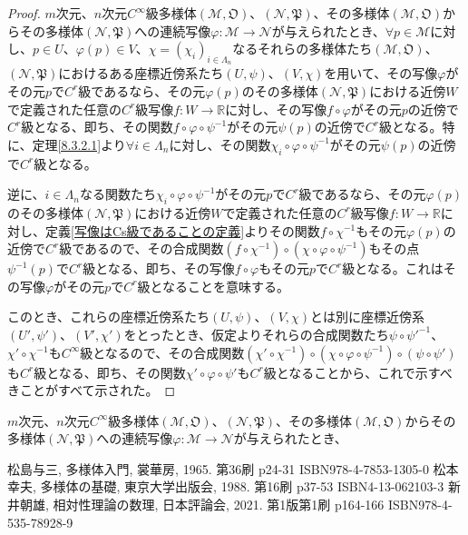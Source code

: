 \documentclass[dvipdfmx]{jsarticle}
\begin{document}
\begin{proof}
$m$次元、$n$次元$C^\infty $級多様体$\left( \mathcal{M},\mathfrak{O} \right) $、$\left( \mathcal{N},\mathfrak{P} \right) $、その多様体$\left( \mathcal{M},\mathfrak{O} \right) $からその多様体$\left( \mathcal{N},\mathfrak{P} \right) $への連続写像$\varphi :\mathcal{M} \rightarrow \mathcal{N} $が与えられたとき、$\forall p\in \mathcal{M}$に対し、$p\in U$、$\varphi \left(p\right) \in V$、$\chi=\left(\chi_i \right)_{i\in \varLambda_n }$なるそれらの多様体たち$\left(\mathcal{M},\mathfrak{O}\right)$、$\left(\mathcal{N},\mathfrak{P}\right)$におけるある座標近傍系たち$\left(U,\psi\right)$、$\left(V,\chi\right)$を用いて、その写像$\varphi $がその元$p$で$C^r $級であるなら、その元$\varphi (p)$のその多様体$\left( \mathcal{N},\mathfrak{P} \right) $における近傍$W$で定義された任意の$C^r $級写像$f:W\rightarrow \mathbb{R} $に対し、その写像$f\circ \varphi $がその元$p$の近傍で$C^r $級となる、即ち、その関数$f\circ \varphi \circ \psi^{-1} $がその元$\psi \left(p\right) $の近傍で$C^r $級となる。特に、定理\ref{8.3.2.1}より$\forall i\in \varLambda_n $に対し、その関数$\chi_i \circ \varphi \circ \psi^{-1} $がその元$\psi \left(p\right) $の近傍で$C^r $級となる。\par
逆に、$i\in \varLambda_n $なる関数たち$\chi_i \circ \varphi \circ \psi^{-1} $がその元$p$で$C^r $級であるなら、その元$\varphi (p)$のその多様体$\left( \mathcal{N},\mathfrak{P} \right) $における近傍$W$で定義された任意の$C^r $級写像$f:W\rightarrow \mathbb{R} $に対し、定義\ref{写像はCs級であることの定義}よりその関数$f\circ \chi^{-1} $もその元$\varphi\left(p\right)$の近傍で$C^r $級であるので、その合成関数$\left( f\circ \chi^{-1} \right) \circ \left( \chi \circ \varphi \circ \psi^{-1} \right) $もその点$\psi^{-1} \left(p\right) $で$C^r $級となる、即ち、その写像$f\circ \varphi $もその元$p$で$C^r $級となる。これはその写像$\varphi $がその元$p$で$C^r $級となることを意味する。\par
このとき、これらの座標近傍系たち$\left(U,\psi\right)$、$\left(V,\chi\right)$とは別に座標近傍系$\left(U',\psi'\right)$、$\left(V',\chi'\right)$をとったとき、仮定よりそれらの合成関数たち$\psi \circ {\psi'}^{-1} $、$\chi' \circ \chi^{-1} $も$C^\infty $級となるので、その合成関数$\left( \chi' \circ \chi^{-1} \right) \circ \left( \chi \circ \varphi \circ \psi^{-1} \right) \circ \left( \psi \circ \psi' \right) $も$C^r $級となる、即ち、その関数$\chi' \circ \varphi \circ \psi' $も$C^r $級となることから、これで示すべきことがすべて示された。
\end{proof}
\begin{dfn}
$m$次元、$n$次元$C^\infty $級多様体$\left( \mathcal{M},\mathfrak{O} \right) $、$\left( \mathcal{N},\mathfrak{P} \right) $、その多様体$\left( \mathcal{M},\mathfrak{O} \right) $からその多様体$\left( \mathcal{N},\mathfrak{P} \right) $への連続写像$\varphi :\mathcal{M} \rightarrow \mathcal{N} $が与えられたとき、  
\end{dfn}
\begin{thebibliography}{50}
  松島与三, 多様体入門, 裳華房, 1965. 第36刷 p24-31 ISBN978-4-7853-1305-0
  松本幸夫, 多様体の基礎, 東京大学出版会, 1988. 第16刷 p37-53 ISBN4-13-062103-3
  新井朝雄, 相対性理論の数理, 日本評論会, 2021. 第1版第1刷 p164-166 ISBN978-4-535-78928-9
\end{thebibliography}
\end{document}
